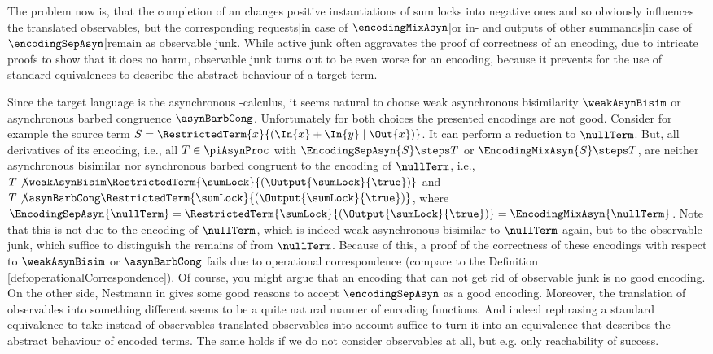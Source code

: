 \documentclass[]{llncs}
\begin{document}
The problem now is, that the completion of an \simulation changes positive instantiations of sum locks into negative ones and so obviously influences the translated observables, but the corresponding requests|in case of $ \encodingMixAsyn $|or in- and outputs of other summands|in case of $ \encodingSepAsyn $|remain as observable junk. While active junk often aggravates the proof of correctness of an encoding, due to intricate proofs to show that it does no harm, observable junk turns out to be even worse for an encoding, because it prevents for the use of standard equivalences to describe the abstract behaviour of a target term.

Since the target language is the asynchronous \piCal-calculus, it seems natural to choose weak asynchronous bisimilarity $ \weakAsynBisim $ or asynchronous barbed congruence $ \asynBarbCong $. Unfortunately for both choices the presented encodings are not good. Consider for example the source term $ S = \RestrictedTerm{x}{\left( \In{x} + \In{y} \mid \Out{x} \right)} $. It can perform a reduction to $ \nullTerm $. But, all derivatives of its encoding, i.e., all $ T \in \piAsynProc $ with $ \EncodingSepAsyn{S} \steps T $ or $ \EncodingMixAsyn{S} \steps T $, are neither asynchronous bisimilar nor synchronous barbed congruent to the encoding of $ \nullTerm $, i.e., $ T \not\weakAsynBisim \RestrictedTerm{\sumLock}{\left( \Output{\sumLock}{\true} \right)} $ and $ T \not\asynBarbCong \RestrictedTerm{\sumLock}{\left( \Output{\sumLock}{\true} \right)} $, where $ \EncodingSepAsyn{\nullTerm} = \RestrictedTerm{\sumLock}{\left( \Output{\sumLock}{\true} \right)} = \EncodingMixAsyn{\nullTerm} $. Note that this is not due to the encoding of $ \nullTerm $, which is indeed weak asynchronous bisimilar to $ \nullTerm $ again, but to the observable junk, which suffice to distinguish the remains of \simulations from $ \nullTerm $. Because of this, a proof of the correctness of these encodings with respect to $ \weakAsynBisim $ or $ \asynBarbCong $ fails due to operational correspondence (compare to the Definition \ref{def:operationalCorrespondence}). Of course, you might argue that an encoding that can not get rid of observable junk is no good encoding. On the other side, Nestmann in \cite{nestmann00} gives some good reasons to accept $ \encodingSepAsyn $ as a good encoding. Moreover, the translation of observables into something different seems to be a quite natural manner of encoding functions. And indeed rephrasing a standard equivalence to take instead of observables translated observables into account suffice to turn it into an equivalence that describes the abstract behaviour of encoded terms. The same holds if we do not consider observables at all, but e.g. only reachability of success.
\end{document}
